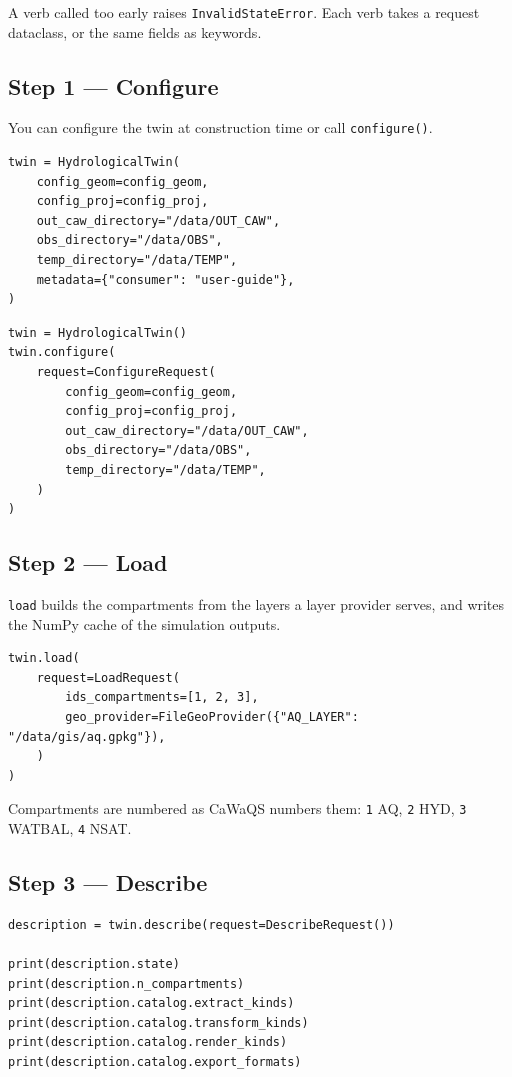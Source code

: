 \documentclass[11pt]{article}
\begin{document}
A verb called too early raises \texttt{InvalidStateError}. Each verb takes a
request dataclass, or the same fields as keywords.

\subsection{Step 1 --- Configure}

You can configure the twin at construction time or call \texttt{configure()}.

\begin{verbatim}
twin = HydrologicalTwin(
    config_geom=config_geom,
    config_proj=config_proj,
    out_caw_directory="/data/OUT_CAW",
    obs_directory="/data/OBS",
    temp_directory="/data/TEMP",
    metadata={"consumer": "user-guide"},
)
\end{verbatim}

\begin{verbatim}
twin = HydrologicalTwin()
twin.configure(
    request=ConfigureRequest(
        config_geom=config_geom,
        config_proj=config_proj,
        out_caw_directory="/data/OUT_CAW",
        obs_directory="/data/OBS",
        temp_directory="/data/TEMP",
    )
)
\end{verbatim}

\subsection{Step 2 --- Load}

\texttt{load} builds the compartments from the layers a layer provider
serves, and writes the NumPy cache of the simulation outputs.

\begin{verbatim}
twin.load(
    request=LoadRequest(
        ids_compartments=[1, 2, 3],
        geo_provider=FileGeoProvider({"AQ_LAYER": "/data/gis/aq.gpkg"}),
    )
)
\end{verbatim}

Compartments are numbered as CaWaQS numbers them: \texttt{1} AQ, \texttt{2}
HYD, \texttt{3} WATBAL, \texttt{4} NSAT.

\subsection{Step 3 --- Describe}

\begin{verbatim}
description = twin.describe(request=DescribeRequest())

print(description.state)
print(description.n_compartments)
print(description.catalog.extract_kinds)
print(description.catalog.transform_kinds)
print(description.catalog.render_kinds)
print(description.catalog.export_formats)
\end{verbatim}
\end{document}
